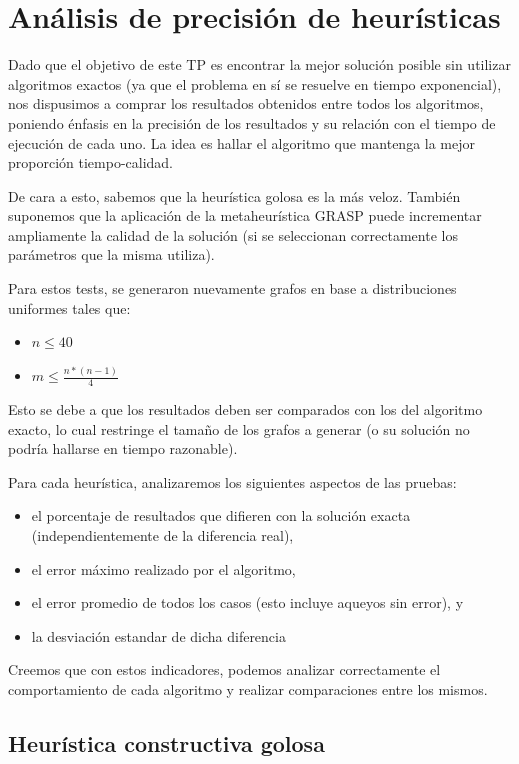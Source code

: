 \section{Análisis de precisión de heurísticas}

Dado que el objetivo de este TP es encontrar la mejor solución posible sin utilizar algoritmos exactos (ya que el problema en sí se resuelve en tiempo exponencial), nos dispusimos a comprar los resultados obtenidos entre todos los algoritmos, poniendo énfasis en la precisión de los resultados y su relación con el tiempo de ejecución de cada uno. La idea es hallar el algoritmo que mantenga la mejor proporción tiempo-calidad.

De cara a esto, sabemos que la heurística golosa es la más veloz. También suponemos que la aplicación de la metaheurística GRASP puede incrementar ampliamente la calidad de la solución (si se seleccionan correctamente los parámetros que la misma utiliza).

Para estos tests, se generaron nuevamente grafos en base a distribuciones uniformes tales que:

\begin{itemize}
	\item $n \leq 40$
	\item $m \leq \frac{n * (n-1)}{4}$
\end{itemize}

Esto se debe a que los resultados deben ser comparados con los del algoritmo exacto, lo cual restringe el tamaño de los grafos a generar (o su solución no podría hallarse en tiempo razonable).

Para cada heurística, analizaremos los siguientes aspectos de las pruebas:

\begin{itemize}
	\item el porcentaje de resultados que difieren con la solución exacta (independientemente de la diferencia real),
	\item el error máximo realizado por el algoritmo,
	\item el error promedio de todos los casos (esto incluye aqueyos sin error), y
	\item la desviación estandar de dicha diferencia
\end{itemize}

Creemos que con estos indicadores, podemos analizar correctamente el comportamiento de cada algoritmo y realizar comparaciones entre los mismos.

\subsection*{Heurística constructiva golosa}

